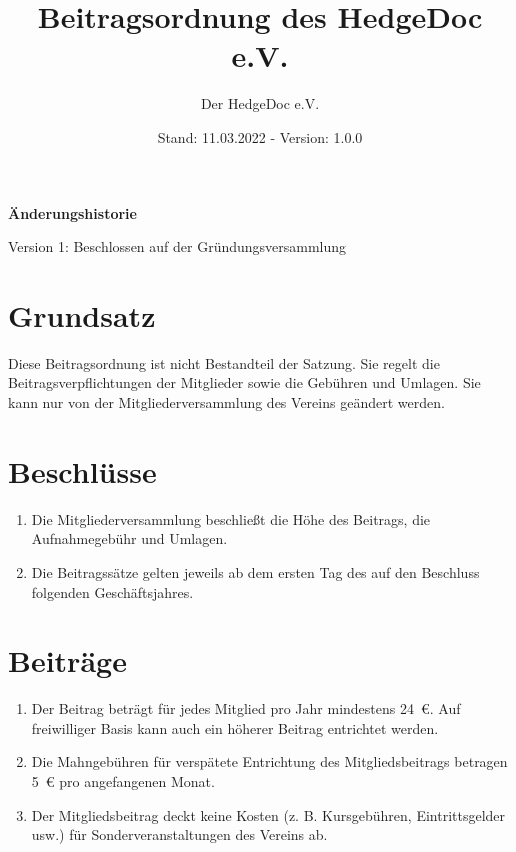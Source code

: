 \documentclass[12pt,paper=a4,ngerman]{scrreprt}
\author{Der HedgeDoc e.V.}
\title{Beitragsordnung des HedgeDoc e.V.}
\date{Stand: 11.03.2022 - Version: 1.0.0}
\begin{document}
	\maketitle
	
	\textbf{Änderungshistorie}
	\begin{description}
		\item
			Version 1: Beschlossen auf der Gründungsversammlung
	\end{description}
	\newpage
	
	\section{Grundsatz}
    	Diese Beitragsordnung ist nicht Bestandteil der Satzung. Sie regelt die Beitragsverpflichtungen der Mitglieder sowie die Gebühren und Umlagen. Sie kann nur von der Mitgliederversammlung des Vereins geändert werden.
	
	\section{Beschlüsse}
	\begin{enumerate}
	    \item
    	    Die Mitgliederversammlung beschließt die Höhe des Beitrags, die Aufnahmegebühr und Umlagen.
        \item 
    	    Die Beitragssätze gelten jeweils ab dem ersten Tag des auf den Beschluss folgenden Geschäftsjahres.
    \end{enumerate}
    	    
    \section{Beiträge}
    \begin{enumerate}
        \item
            Der Beitrag beträgt für jedes Mitglied pro Jahr mindestens 24 €. Auf freiwilliger Basis kann auch ein höherer Beitrag entrichtet werden.
        \item
            \label{sec:beiträge:mahngebühren}
            Die Mahngebühren für verspätete Entrichtung des Mitgliedsbeitrags betragen 5 € pro angefangenen Monat.
        \item
            Der Mitgliedsbeitrag deckt keine Kosten (z. B. Kursgebühren, Eintrittsgelder usw.) für Sonderveranstaltungen des Vereins ab.
    \end{enumerate}
    	    
\end{document}
